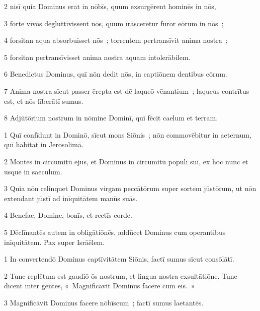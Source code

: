 \psalmVerse
  {\phantom{00}2}
  {nisī quia Dominus erat in nōbīs, quum exsurgērent hominēs in nōs,}


\psalmVerse
  {\phantom{00}3}
  {forte vīvōs dēgluttīvissent nōs, quum īrāscerētur furor eōrum in nōs~;}


\psalmVerse
  {\phantom{00}4}
  {forsitan aqua absorbuisset nōs~; torrentem pertransīvit anima nostra~;}


\psalmVerse
  {\phantom{00}5}
  {forsitan pertransīvisset anima nostra aquam intolerābilem.}


\psalmVerse
  {\phantom{00}6}
  {Benedictus Dominus, quī nōn dedit nōs, in captiōnem dentibus eōrum.}


\psalmVerse
  {\phantom{00}7}
  {Anima nostra sīcut passer ērepta est dē laqueō vēnantium~; laqueus contrītus est, et nōs līberātī sumus.}


\psalmVerse
  {\phantom{00}8}
  {Adjūtōrium nostrum in nōmine Dominī, quī fēcit caelum et terram.}




\psalmVerse
  {\phantom{00}1}
  {Quī confīdunt in Dominō, sīcut mons Siōnis~; nōn commovēbitur in aeternum, quī habitat in Jerosolimā.}


\psalmVerse
  {\phantom{00}2}
  {Montēs in circumitū ejus, et Dominus in circumitū populī suī, ex hōc nunc et usque in saeculum.}


\psalmVerse
  {\phantom{00}3}
  {Quia nōn relinquet Dominus virgam peccātōrum super sortem jūstōrum, ut nōn extendant jūstī ad inīquitātem manūs suās.}


\psalmVerse
  {\phantom{00}4}
  {Benefac, Domine, bonīs, et rectīs corde.}


\psalmVerse
  {\phantom{00}5}
  {Dēclīnantēs autem in obligātiōnēs, addūcet Dominus cum operantibus inīquitātem. Pax super Isrāēlem.}



\psalmVerse
  {\phantom{00}1}
  {In convertendō Dominus captīvitātem Siōnis, factī sumus sīcut consōlātī.}


\psalmVerse
  {\phantom{00}2}
  {Tunc replētum est gaudiō ōs nostrum, et lingua nostra exsultātiōne. Tunc dīcent inter gentēs, «~Magnificāvit Dominus facere cum eīs.~»}


\psalmVerse
  {\phantom{00}3}
  {Magnificāvit Dominus facere nōbīscum~; factī sumus laetantēs.}


